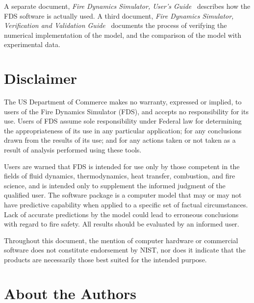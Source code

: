 \documentclass[11pt]{book}
\begin{document}
A separate document, {\em Fire Dynamics Simulator, User's Guide}~\cite{FDS_Users_Guide_5} describes how the FDS software is
actually used. A third document, {\em Fire Dynamics Simulator, Verification and Validation Guide}~\cite{FDS_VV_Guide_5} documents
the process of verifying the numerical implementation of the model, and the comparison of the model with experimental data.


\chapter{Disclaimer}

The US Department of Commerce makes no warranty, expressed or implied,
to users of the Fire Dynamics Simulator (FDS), and accepts no responsibility for its use.
Users of FDS assume sole responsibility under Federal law for determining
the appropriateness of its use in any particular application;
for any conclusions drawn from the results of its use; and for any
actions taken or not taken as a result of analysis performed using these tools.

Users are warned that FDS is intended for use only by those competent
in the fields of fluid dynamics, thermodynamics, heat transfer, combustion, and fire science,
and is intended only to supplement the informed judgment of the qualified user.
The software package is a computer model that may or may not have predictive
capability when applied to a specific set of factual circumstances.
Lack of accurate predictions by the model could lead to erroneous
conclusions with regard to fire safety. All results should be evaluated by an informed user.

Throughout this document, the mention of computer hardware or commercial
software does not constitute endorsement by NIST, nor does it indicate that
the products are necessarily those best suited for the intended purpose.


\chapter{About the Authors}
\end{document}
